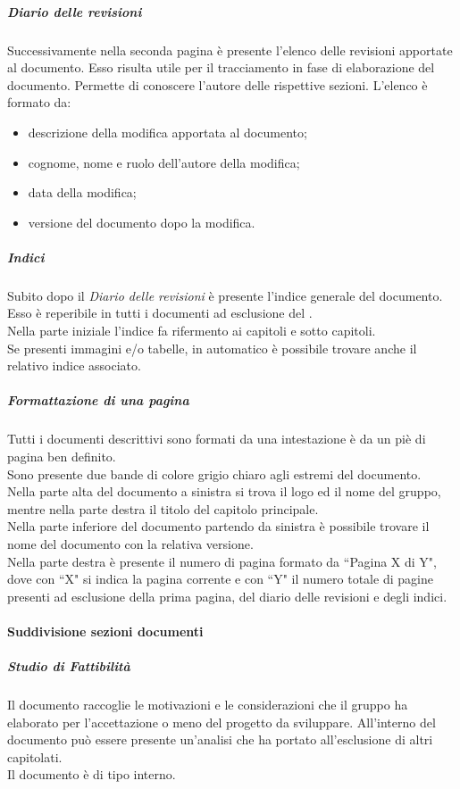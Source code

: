 				\subparagraph{Diario delle revisioni}
				Successivamente nella seconda pagina è presente l'elenco delle revisioni apportate al documento. Esso risulta utile per il tracciamento in fase di elaborazione del documento. Permette di conoscere l'autore delle rispettive sezioni. L'elenco è formato da:
				\begin{itemize}
					\item descrizione della modifica apportata al documento;
					\item cognome, nome e ruolo dell'autore della modifica;
					\item data della modifica;
					\item versione del documento dopo la modifica.
				\end{itemize}

				\subparagraph{Indici}
				Subito dopo il \emph{Diario delle revisioni} è presente l'indice generale del documento. Esso è reperibile in tutti i documenti ad esclusione del \docGlossary.\\
				Nella parte iniziale l'indice fa rifermento ai capitoli e sotto capitoli.\\
				Se presenti immagini e/o tabelle, in automatico è possibile trovare anche il relativo indice associato.
			
				\subparagraph{Formattazione di una pagina}
				Tutti i documenti descrittivi sono formati da una intestazione è da un piè di pagina ben definito.\\
				Sono presente due bande di colore grigio chiaro agli estremi del documento.\\
				Nella parte alta del documento a sinistra si trova il logo ed il nome del gruppo, mentre nella parte destra il titolo del capitolo principale.\\
				Nella parte inferiore del documento partendo da sinistra è possibile trovare il nome del documento con la relativa versione.\\
				Nella parte destra è presente il numero di pagina formato da ``Pagina X di Y", dove con ``X" si indica la pagina corrente e con ``Y" il numero totale di pagine presenti ad esclusione della prima pagina, del diario delle revisioni e degli indici.

			\paragraph{Suddivisione sezioni documenti}

				\subparagraph{Studio di Fattibilità} Il documento raccoglie le motivazioni e le considerazioni che il gruppo ha elaborato per l'accettazione o meno del progetto da sviluppare. All'interno del documento può essere presente un'analisi che ha portato all'esclusione di altri capitolati.\\
				Il documento è di tipo interno.

